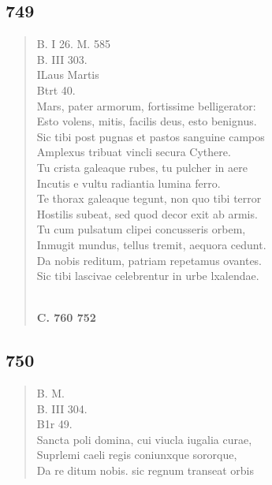 \documentclass[11pt, a4paper]{report}
\begin{document}
            \subsection*{749}
      \begin{verse}
      B. I 26. M. 585 \\ B. III 303. \\ ILaus Martis \\ Btrt 40. \\ Mars, pater armorum, fortissime belligerator: \\ Esto volens, mitis, facilis deus, esto benignus. \\ Sic tibi post pugnas et pastos sanguine campos \\ Amplexus tribuat vincli secura Cythere. \\ Tu crista galeaque rubes, tu pulcher in aere \\ Incutis e vultu radiantia lumina ferro. \\ Te thorax galeaque tegunt, non quo tibi terror \\ Hostilis subeat, sed quod decor exit ab armis. \\ Tu cum pulsatum clipei concusseris orbem, \\ Inmugit mundus, tellus tremit, aequora cedunt. \\ Da nobis reditum, patriam repetamus ovantes. \\ Sic tibi lascivae celebrentur in urbe lxalendae. \\ 
        ﻿\pagebreak 
    \begin{center} \textbf{C. 760 752} \end{center}
      \end{verse}
  
            \subsection*{750}
      \begin{verse}
      B. M. \\ B. III 304. \\ B1r 49. \\  \lbrack Sancta \rbrack  poli domina, cui viucla iugalia curae, \\  \lbrack Suprlemi caeli regis coniunxque sororque, \\  \lbrack Da re \rbrack ditum nobis. sic regnum transeat orbis \\ 
      \end{verse}
  
\end{document}
